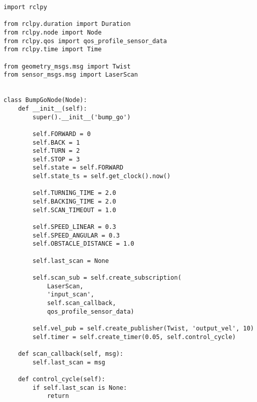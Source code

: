  \footnotesize
\begin{tcolorbox}[sharp corners, colframe=gray!80, colback=LightGray, left=0pt, top=0pt, bottom=0pt, title=\texttt{br2\_fsm\_bumpgo\_py/br2\_fsm\_bumpgo\_py/\_\_init\_\_.py}]
  \begin{verbatim}
    \end{verbatim}
    \end{tcolorbox}
  \normalsize

 \footnotesize
\begin{tcolorbox}[sharp corners, colframe=gray!80, colback=LightGray, left=0pt, top=0pt, bottom=0pt, title=\texttt{br2\_fsm\_bumpgo\_py/br2\_fsm\_bumpgo\_py/bump\_go\_main.py}]
  \begin{verbatim}
import rclpy

from rclpy.duration import Duration 
from rclpy.node import Node 
from rclpy.qos import qos_profile_sensor_data 
from rclpy.time import Time 

from geometry_msgs.msg import Twist 
from sensor_msgs.msg import LaserScan 


class BumpGoNode(Node): 
    def __init__(self): 
        super().__init__('bump_go') 

        self.FORWARD = 0 
        self.BACK = 1 
        self.TURN = 2 
        self.STOP = 3
        self.state = self.FORWARD 
        self.state_ts = self.get_clock().now()

        self.TURNING_TIME = 2.0
        self.BACKING_TIME = 2.0
        self.SCAN_TIMEOUT = 1.0

        self.SPEED_LINEAR = 0.3
        self.SPEED_ANGULAR = 0.3
        self.OBSTACLE_DISTANCE = 1.0

        self.last_scan = None
 
        self.scan_sub = self.create_subscription( 
            LaserScan, 
            'input_scan', 
            self.scan_callback, 
            qos_profile_sensor_data) 

        self.vel_pub = self.create_publisher(Twist, 'output_vel', 10) 
        self.timer = self.create_timer(0.05, self.control_cycle) 
 
    def scan_callback(self, msg): 
        self.last_scan = msg 
 
    def control_cycle(self): 
        if self.last_scan is None: 
            return


\end{verbatim}
\end{tcolorbox}
